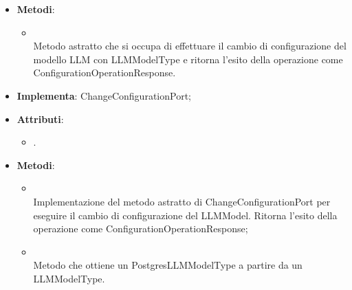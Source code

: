 \documentclass[10pt, a4paper]{article}
\begin{document}
\label{ChangeConfigurationPortDettaglio}
\begin{itemize}
    \item \textbf{Metodi}:
    \begin{itemize}
        \item {}\\
        Metodo astratto che si occupa di effettuare il cambio di configurazione del modello LLM con LLMModelType e ritorna l'esito della operazione come ConfigurationOperationResponse.
    \end{itemize}
\end{itemize}

\label{ChangeConfigurationPostgresDettaglio}
\begin{itemize}
    \item \textbf{Implementa}: ChangeConfigurationPort;
    \item \textbf{Attributi}:
    \begin{itemize}
        \item {}.
    \end{itemize}
    \item \textbf{Metodi}:
    \begin{itemize}
        \item {}\\
        Implementazione del metodo astratto di ChangeConfigurationPort per eseguire il cambio di configurazione del LLMModel. Ritorna l'esito della operazione come ConfigurationOperationResponse;
        \item {}\\
        Metodo che ottiene un PostgresLLMModelType a partire da un LLMModelType.
    \end{itemize}
\end{itemize}
\end{document}

